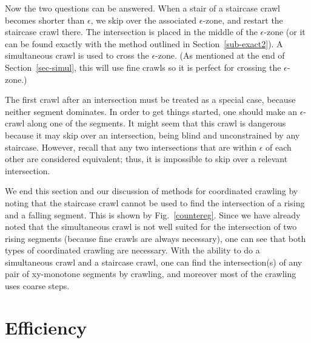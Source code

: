 Now the two questions can be answered.
When a stair of a staircase crawl becomes shorter than $\epsilon$, we 
skip over the associated $\epsilon$-zone, and restart the staircase crawl there.
The intersection is placed in the middle of the $\epsilon$-zone (or it can be found exactly
with the method outlined in Section~\ref{sub-exact2}).
A simultaneous crawl is used to cross the $\epsilon$-zone.
(As mentioned at the end of Section~\ref{sec-simul}, this will use fine crawls so 
	it is perfect for crossing the $\epsilon$-zone.)

The first crawl after an intersection must be treated as a special case, because neither 
segment dominates.
In order to get things started, one should make an $\epsilon$-crawl along one of the segments.
It might seem that this crawl is dangerous because it may skip over an intersection,
being blind and unconstrained by any staircase.
However, recall that any two intersections that are within $\epsilon$ of each other
are considered equivalent;  thus, it is impossible to skip over a relevant intersection.

We end this section and our discussion of methods for coordinated crawling by noting
that the staircase crawl cannot be used to find the intersection of a rising and a 
falling segment.
This is shown by Fig.~\ref{countereg}.
Since we have already noted that the simultaneous crawl is not well suited for the intersection
of two rising segments (because fine crawls are always necessary),
one can see that both types of coordinated crawling are necessary.
With the ability to do a simultaneous crawl and a staircase crawl, one can find the intersection(s)
of any pair of xy-monotone segments by crawling, and moreover most of the crawling uses coarse 
steps.


\section{Efficiency}

